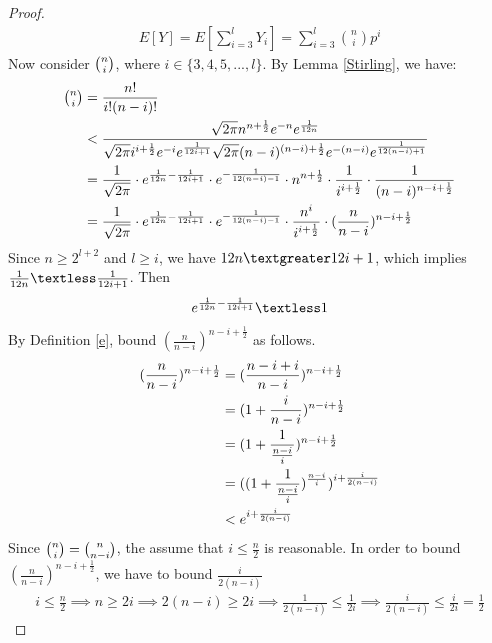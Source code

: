 \begin{proof}
\begin{align}
    \nonumber E[Y] = E[\sum_{i=3}^{l}Y_i]=\sum_{i = 3}^{l}{\binom{n}{i} p^i}
\end{align}
Now consider $\tbinom{n}{i}$, where $i\in\{3,4,5,...,l\}$. By Lemma \ref{Stirling}, we have:
\begin{align}
   \nonumber\tbinom{n}{i}&=\frac{n!}{i!(n-i)!}\\
    \nonumber&\textless \frac{\sqrt{2\pi}n^{n+\frac{1}{2}}e^{-n}e^{\frac{1}{12n}}}{\sqrt{2\pi}i^{i+\frac{1}{2}}e^{-i}e^{\frac{1}{12i+1}}\sqrt{2\pi}(n-i)^{(n-i)+\frac{1}{2}}e^{-(n-i)}e^{\frac{1}{12(n-i)+1}}}\\
    \nonumber &=\frac{1}{\sqrt{2\pi}}\cdot e^{\frac{1}{12n}-\frac{1}{12i+1}}\cdot e^{-\frac{1}{12(n-i)-1}} \cdot n^{n+\frac{1}{2}} \cdot \frac{1}{i^{i+\frac{1}{2}}} \cdot \frac{1}{(n-i)^{n-i+\frac{1}{2}}}\\
    &=\frac{1}{\sqrt{2\pi}}\cdot e^{\frac{1}{12n}-\frac{1}{12i+1}}\cdot e^{-\frac{1}{12(n-i)-1}} \cdot \frac{n^i}{i^{i+\frac{1}{2}}} \cdot (\frac{n}{n-i})^{n-i+\frac{1}{2}}\label{a}
\end{align}
Since $n\ge 2^{l+2}$ and $l\ge i$, we have $12n \textgreater 12i+1$, which implies $\frac{1}{12n} \textless \frac{1}{12i+1}$. Then
\begin{align}
     e^{\frac{1}{12n}-\frac{1}{12i+1}} \textless 1 \label{b}
\end{align}
By Definition \ref{e}, bound $(\frac{n}{n-i})^{n-i+\frac{1}{2}}$ as follows.
\begin{align}
    \nonumber (\frac{n}{n-i})^{n-i+\frac{1}{2}}
    &= (\frac{n-i+i}{n-i})^{n-i+\frac{1}{2}}\\
    \nonumber&= (1+\frac{i}{n-i})^{n-i+\frac{1}{2}}\\
    \nonumber&= (1+\frac{1}{\frac{n-i}{i}})^{n-i+\frac{1}{2}}\\
    \nonumber&= ((1+\frac{1}{\frac{n-i}{i}})^{\frac{n-i}{i}})^{i+\frac{i}{2(n-i)}}\\
    \nonumber &\textless e^{i+\frac{i}{2(n-i)}}
\end{align}
Since $\tbinom{n}{i}=\tbinom{n}{n-i}$, the assume that $i\le \frac{n}{2}$ is reasonable. In order to bound $(\frac{n}{n-i})^{n-i+\frac{1}{2}}$, we have to bound $\frac{i}{2(n-i)}$
\begin{align}
   \nonumber i\le \frac{n}{2} 
   \implies n \ge 2i 
   \implies 2(n-i) \ge 2i \implies \frac{1}{2(n-i)} \le \frac{1}{2i} \implies  \frac{i}{2(n-i)} \le \frac{i}{2i} =\frac{1}{2}

\end{align}
\end{proof}
